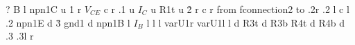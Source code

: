 \documentclass[a4paper,12pt]{article}
\begin{document}
\begin{table}[hbtp]

\begin{center}

\begin{circuit}{0}
 {?} B l														%
\frompin npn1C														%
 u																%
\.1																	%
 r																%
\cc{} {$V_{CE}$} c r 								%
\htopin .1															%
 u																%
 {$I_C$} u														%
\frompin R1t														%
 u																%
\.2 																	%
 r																%
\cc{} {} c r			 								%
 from fconnection2 to .2r	%
\htopin .2														 	%
 l																%
\cc{} {} c l 										%
\htopin .2															%
\frompin npn1E														%
 d 																%
\.3																	%
\vtopin gnd1														%
 d																%
\atpin npn1B														%
 l																%
 {$I_B$} l														%
 l																%
\nl{} {} l														%
\htopin varU1r														%
\frompin varU1l													%
 l																%
 d																%
\vtopin R3t															%
\nl{} {} d 														%
\frompin R3b														%
\vtopin R4t															%
\nl{} {} d															%
\frompin R4b														%
 d																%
\htopin .3															%
\frompin .3l														%
 r																%
\end{circuit}

\end{center}

\end{table}
\end{document}

